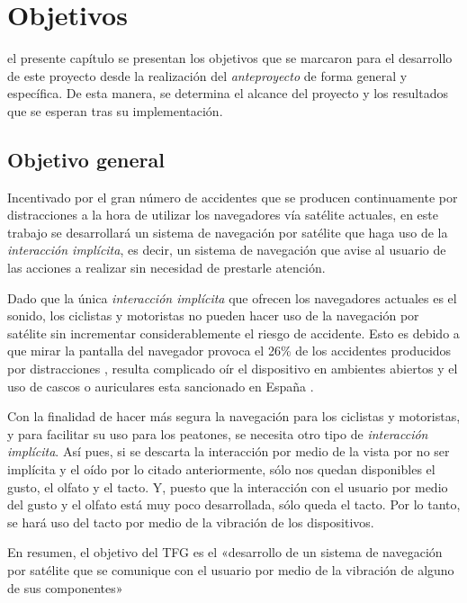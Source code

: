 \chapter{Objetivos}
\label{chap:objetivos}

 el presente capítulo se presentan los objetivos que se marcaron para el desarrollo de
este proyecto desde la realización del \emph{anteproyecto} de forma general y específica. De esta
manera, se determina el alcance del proyecto y los resultados que se esperan tras su implementación.

\section{Objetivo general}

Incentivado por el gran número de accidentes que se producen continuamente por distracciones a la
hora de utilizar los navegadores vía satélite actuales, en este trabajo se desarrollará un sistema
de navegación por satélite que haga uso de la \emph{interacción implícita}, es decir, un sistema de
navegación que avise al usuario de las acciones a realizar sin necesidad de prestarle atención.

Dado que la única \emph{interacción implícita} que ofrecen los navegadores actuales es el sonido,
los ciclistas y motoristas no pueden hacer uso de la navegación por satélite sin incrementar
considerablemente el riesgo de accidente. Esto es debido a que mirar la pantalla del navegador
provoca el 26\% de los accidentes producidos por distracciones \cite{Allianz14}, resulta complicado
oír el dispositivo en ambientes abiertos y el uso de cascos o auriculares esta sancionado en
España \cite{Serrano14}.

Con la finalidad de hacer más segura la navegación para los ciclistas y motoristas, y para facilitar
su uso para los peatones, se necesita otro tipo de \emph{interacción implícita}. Así pues, si se
descarta la interacción por medio de la vista por no ser implícita y el oído por lo citado
anteriormente, sólo nos quedan disponibles el gusto, el olfato y el tacto. Y, puesto que la
interacción con el usuario por medio del gusto y el olfato está muy poco desarrollada, sólo queda el
tacto. Por lo tanto, se hará uso del tacto por medio de la vibración de los dispositivos.

En resumen, el objetivo del \acf{TFG} es el «desarrollo de un sistema de navegación
  por satélite que se comunique con el usuario por medio de la vibración de alguno de sus
  componentes»


